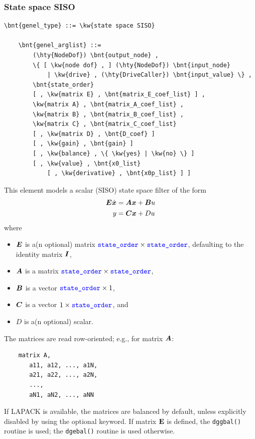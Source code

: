 \subsubsection{State space SISO}
\label{sec:EL:GENEL:STATE-SPACE-SISO}
\begin{Verbatim}[commandchars=\\\{\}]
    \bnt{genel_type} ::= \kw{state space SISO}

    \bnt{genel_arglist} ::=
        (\hty{NodeDof}) \bnt{output_node} ,
        \{ [ \kw{node dof} , ] (\hty{NodeDof}) \bnt{input_node}
            | \kw{drive} , (\hty{DriveCaller}) \bnt{input_value} \} ,
        \bnt{state_order}
        [ , \kw{matrix E} , \bnt{matrix_E_coef_list} ] ,
        \kw{matrix A} , \bnt{matrix_A_coef_list} ,
        \kw{matrix B} , \bnt{matrix_B_coef_list} ,
        \kw{matrix C} , \bnt{matrix_C_coef_list}
        [ , \kw{matrix D} , \bnt{D_coef} ]
        [ , \kw{gain} , \bnt{gain} ]
        [ , \kw{balance} , \{ \kw{yes} | \kw{no} \} ]
        [ , \kw{value} , \bnt{x0_list}
            [ , \kw{derivative} , \bnt{x0p_list} ] ]
\end{Verbatim}
This element models a scalar (SISO) state space filter of the form
\begin{align*}
	\boldsymbol{E} \dot{\boldsymbol{x}} &= \boldsymbol{A} \boldsymbol{x} + \boldsymbol{B} u \\
	y &= \boldsymbol{C} \boldsymbol{x} + D u
\end{align*}
where
\begin{itemize}
\item $\boldsymbol{E}$ is a(n optional) matrix
	$\textcolor{blue}{\texttt{state\_order}} \times \textcolor{blue}{\texttt{state\_order}}$, defaulting to the identity matrix $\boldsymbol{I}$,
\item $\boldsymbol{A}$ is a matrix
	$\textcolor{blue}{\texttt{state\_order}} \times \textcolor{blue}{\texttt{state\_order}}$,
\item $\boldsymbol{B}$ is a vector
	$\textcolor{blue}{\texttt{state\_order}} \times 1$,
\item $\boldsymbol{C}$ is a vector
	$1 \times \textcolor{blue}{\texttt{state\_order}}$, and
\item $D$ is a(n optional) scalar.
\end{itemize}
The matrices are read row-oriented; e.g., for matrix $\boldsymbol{A}$:
\begin{verbatim}
    matrix A,
       a11, a12, ..., a1N,
       a21, a22, ..., a2N,
       ...,
       aN1, aN2, ..., aNN
\end{verbatim}

If LAPACK is available, the matrices are balanced by default,
unless explicitly disabled by using the  optional keyword.
If matrix $\bm{\mathbf E}$ is defined, the \texttt{dggbal()} routine is used;
the \texttt{dgebal()} routine is used otherwise.

